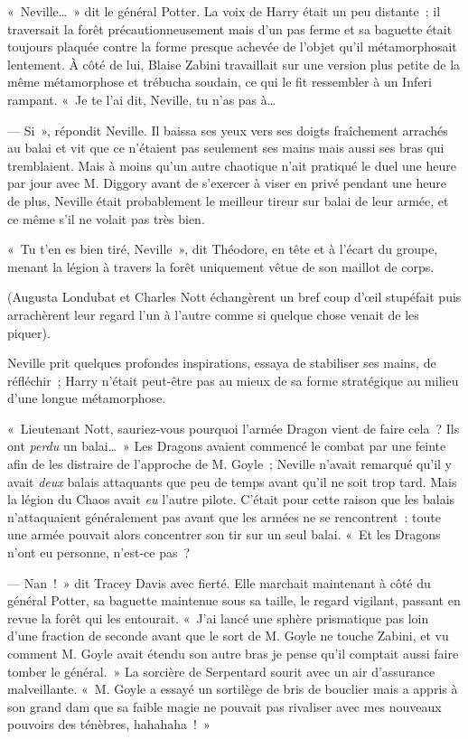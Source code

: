 «~Neville…~» dit le général Potter. La voix de Harry était un peu distante~; il traversait la forêt précautionneusement mais d'un pas ferme et sa baguette était toujours plaquée contre la forme presque achevée de l'objet qu'il métamorphosait lentement. À côté de lui, Blaise Zabini travaillait sur une version plus petite de la même métamorphose et trébucha soudain, ce qui le fit ressembler à un Inferi rampant. «~Je te l'ai dit, Neville, tu n'as pas à…

--- Si~», répondit Neville. Il baissa ses yeux vers ses doigts fraîchement arrachés au balai et vit que ce n'étaient pas seulement ses mains mais aussi ses bras qui tremblaient. Mais à moins qu'un autre chaotique n'ait pratiqué le duel une heure par jour avec M. Diggory avant de s'exercer à viser en privé pendant une heure de plus, Neville était probablement le meilleur tireur sur balai de leur armée, et ce même s'il ne volait pas très bien.

«~Tu t'en es bien tiré, Neville~», dit Théodore, en tête et à l'écart du groupe, menant la légion à travers la forêt uniquement vêtue de son maillot de corps.

(Augusta Londubat et Charles Nott échangèrent un bref coup d'œil stupéfait puis arrachèrent leur regard l'un à l'autre comme si quelque chose venait de les piquer).

Neville prit quelques profondes inspirations, essaya de stabiliser ses mains, de réfléchir~; Harry n'était peut-être pas au mieux de sa forme stratégique au milieu d'une longue métamorphose.

«~Lieutenant Nott, sauriez-vous pourquoi l'armée Dragon vient de faire cela~? Ils ont \emph{perdu} un balai…~» Les Dragons avaient commencé le combat par une feinte afin de les distraire de l'approche de M. Goyle~; Neville n'avait remarqué qu'il y avait \emph{deux} balais attaquants que peu de temps avant qu'il ne soit trop tard. Mais la légion du Chaos avait \emph{eu} l'autre pilote. C'était pour cette raison que les balais n'attaquaient généralement pas avant que les armées ne se rencontrent~: toute une armée pouvait alors concentrer son tir sur un seul balai. «~Et les Dragons n'ont eu personne, n'est-ce pas~?

--- Nan~!~» dit Tracey Davis avec fierté. Elle marchait maintenant à côté du général Potter, sa baguette maintenue sous sa taille, le regard vigilant, passant en revue la forêt qui les entourait. «~J'ai lancé une sphère prismatique pas loin d'une fraction de seconde avant que le sort de M. Goyle ne touche Zabini, et vu comment M. Goyle avait étendu son autre bras je pense qu'il comptait aussi faire tomber le général.~» La sorcière de Serpentard sourit avec un air d'assurance malveillante. «~M. Goyle a essayé un sortilège de bris de bouclier mais a appris à son grand dam que sa faible magie ne pouvait pas rivaliser avec mes nouveaux pouvoirs des ténèbres, hahahaha~!~»

